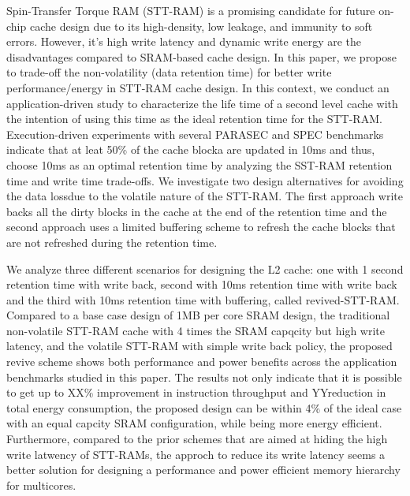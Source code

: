 Spin-Transfer Torque RAM (STT-RAM) is a promising candidate for future  
on-chip cache design due to its high-density, low leakage, and immunity to 
soft errors.  However, it's high write latency and dynamic
write energy are the disadvantages compared to SRAM-based cache design.
In this paper, we propose to trade-off the non-volatility (data retention time)
for better write performance/energy in STT-RAM cache design.
In this context, we conduct an application-driven study to characterize the
life time of a second level cache with the intention of using this time as the ideal
retention time for the STT-RAM. Execution-driven experiments with several PARASEC and SPEC benchmarks 
indicate that at leat 50\% of the cache blocka are updated in 10ms and thus, choose 10ms
as an optimal retention time by analyzing the SST-RAM retention time and write time trade-offs.
We investigate two design alternatives for avoiding the data lossdue to the volatile nature of the
STT-RAM. The first approach write backs all the dirty blocks in the cache at the end of the retention time
and the second approach uses a limited buffering scheme to refresh the cache blocks that are not refreshed 
during the retention time.

We analyze three different scenarios for designing the L2 cache: one with 1 second retention time with write back, 
second with 10ms retention time with write back and the third with 10ms retention time with buffering, called 
revived-STT-RAM. Compared to a base case design of 1MB per core SRAM design, the traditional non-volatile STT-RAM 
cache with 4 times the SRAM capqcity but high write latency, and the volatile STT-RAM with simple write back policy,
the proposed revive scheme shows both performance and power benefits across the application benchmarks studied in
this paper. The results not only indicate that it is possible to get up to XX\% improvement in instruction
throughput and YY\I reduction in total energy consumption, the proposed design can be within 4\% of the ideal case
with an equal capcity SRAM configuration, while being more energy efficient.
Furthermore, compared to the prior schemes that are aimed at hiding the high write latwency of STT-RAMs,
the approch to reduce its write latency seems a better solution for designing a performance and power efficient
memory hierarchy for multicores.
